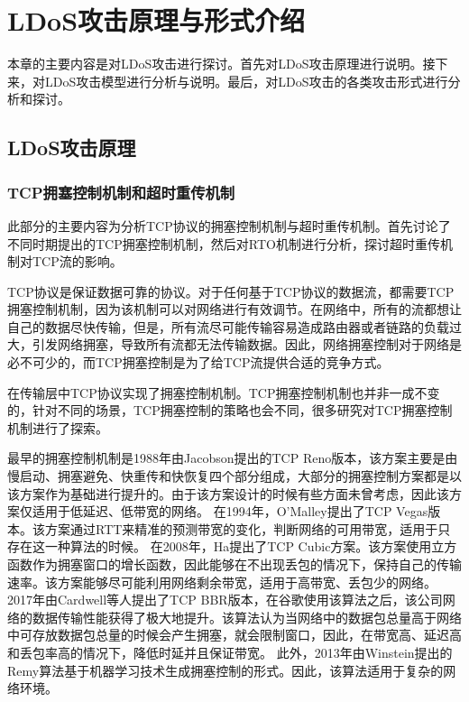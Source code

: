 \chapter{LDoS攻击原理与形式介绍}
\label{cha:LDoS}

本章的主要内容是对LDoS攻击进行探讨。首先对LDoS攻击原理进行说明。接下来，对LDoS攻击模型进行分析与说明。最后，对LDoS攻击的各类攻击形式进行分析和探讨。

\section{LDoS攻击原理}
\label{chap3:LDoSstate}

\subsection{TCP拥塞控制机制和超时重传机制}

此部分的主要内容为分析TCP协议的拥塞控制机制与超时重传机制。首先讨论了不同时期提出的TCP拥塞控制机制，然后对RTO机制进行分析，探讨超时重传机制对TCP流的影响。

TCP协议是保证数据可靠的协议。对于任何基于TCP协议的数据流，都需要TCP拥塞控制机制，因为该机制可以对网络进行有效调节。在网络中，所有的流都想让自己的数据尽快传输，但是，所有流尽可能传输容易造成路由器或者链路的负载过大，引发网络拥塞，导致所有流都无法传输数据。因此，网络拥塞控制对于网络是必不可少的，而TCP拥塞控制是为了给TCP流提供合适的竞争方式。

在传输层中TCP协议实现了拥塞控制机制。TCP拥塞控制机制也并非一成不变的，针对不同的场景，TCP拥塞控制的策略也会不同，很多研究对TCP拥塞控制机制进行了探索。

最早的拥塞控制机制是1988年由Jacobson\cite{Jacobson1988Congestion}提出的TCP Reno版本，该方案主要是由慢启动、拥塞避免、快重传和快恢复四个部分组成，大部分的拥塞控制方案都是以该方案作为基础进行提升的。由于该方案设计的时候有些方面未曾考虑，因此该方案仅适用于低延迟、低带宽的网络。
在1994年，O’Malley\cite{O1994TCP}提出了TCP Vegas版本。该方案通过RTT来精准的预测带宽的变化，判断网络的可用带宽，适用于只存在这一种算法的时候。
在2008年，Ha\cite{Ha2008CUBIC}提出了TCP Cubic方案。该方案使用立方函数作为拥塞窗口的增长函数，因此能够在不出现丢包的情况下，保持自己的传输速率。该方案能够尽可能利用网络剩余带宽，适用于高带宽、丢包少的网络。
2017年由Cardwell\cite{Cardwell2017BBR}等人提出了TCP BBR版本，在谷歌使用该算法之后，该公司网络的数据传输性能获得了极大地提升。该算法认为当网络中的数据包总量高于网络中可存放数据包总量的时候会产生拥塞，就会限制窗口，因此，在带宽高、延迟高和丢包率高的情况下，降低时延并且保证带宽。
此外，2013年由Winstein\cite{Winstein2013Remy}提出的Remy算法基于机器学习技术生成拥塞控制的形式。因此，该算法适用于复杂的网络环境。

